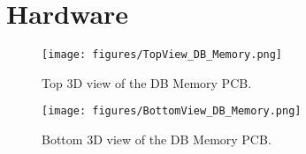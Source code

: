 %
%
%
%
%

%
%
%
%
%
%
%

\chapter{Hardware} \label{ch:hardware}

\begin{figure}[!ht]
    \begin{center}
        \texttt{[image: figures/TopView\_DB\_Memory.png]}
        \caption{Top 3D view of the DB Memory PCB.}
        \label{fig:pcb-3d-TopView}
    \end{center}
\end{figure}

\begin{figure}[!ht]
    \begin{center}
        \texttt{[image: figures/BottomView\_DB\_Memory.png]}
        \caption{Bottom 3D view of the DB Memory PCB.}
        \label{fig:pcb-3d-BottomView}
    \end{center}
\end{figure}